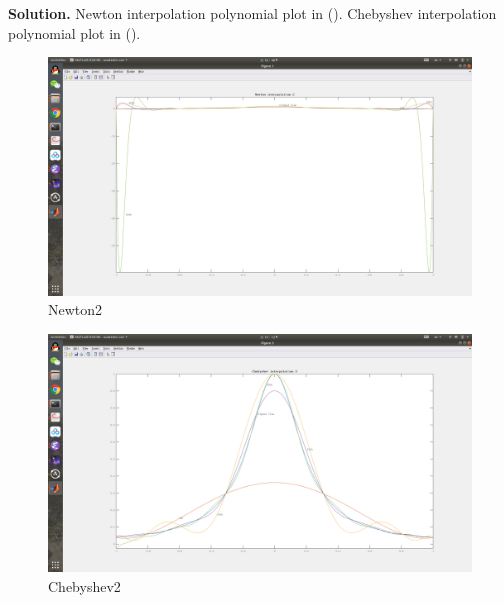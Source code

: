 \documentclass[a4paper]{book}
\newenvironment{solution}%
{\noindent\textbf{Solution.}}%
{\qedhere}
\numberwithin{equation}{chapter}
\theoremstyle{definition}
\begin{document}
\begin{solution}
  Newton interpolation polynomial plot in ().
  Chebyshev interpolation polynomial plot in ().
  \begin{figure}[]
    \centering
    \includegraphics*[scale = 0.25]{code/Data/c1}
    \caption{Newton2}\label{fig:2}
  \end{figure}
  \begin{figure}[]
    \centering
    \includegraphics*[scale = 0.25]{code/Data/c2}
    \caption{Chebyshev2}\label{fig:3}
  \end{figure}
\end{solution}




\end{document}
